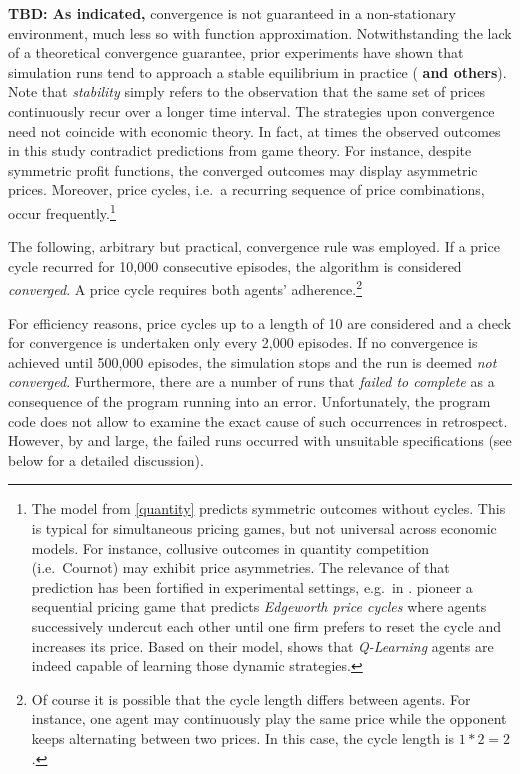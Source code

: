 \textbf{TBD: As indicated,} convergence is not guaranteed in a non-stationary environment, much less so with function approximation. Notwithstanding the lack of a theoretical convergence guarantee, prior experiments have shown that simulation runs tend to approach a stable equilibrium in practice (\cite{calvano_artificial_2019} \textbf{and others}). Note that \emph{stability} simply refers to the observation that the same set of prices continuously recur over a longer time interval. The strategies upon convergence need not coincide with economic theory. In fact, at times the observed outcomes in this study contradict predictions from game theory. For instance, despite symmetric profit functions, the converged outcomes may display asymmetric prices. Moreover, price cycles, i.e.\ a recurring sequence of price combinations, occur frequently.\footnote{The model from \autoref{quantity} predicts symmetric outcomes without cycles. This is typical for simultaneous pricing games, but not universal across economic models. For instance, collusive outcomes in quantity competition (i.e.\ Cournot) may exhibit price asymmetries. The relevance of that prediction has been fortified in experimental settings, e.g.\ in \textcite{fischer_collusion_2019}. \textcite{maskine-tirole} pioneer a sequential pricing game that predicts \emph{Edgeworth price cycles} where agents successively undercut each other until one firm prefers to reset the cycle and increases its price. Based on their model, \textcite{klein_autonomous_2019} shows that \emph{Q-Learning} agents are indeed capable of learning those dynamic strategies.}


The following, arbitrary but practical, convergence rule was employed. If a price cycle recurred for 10,000 consecutive episodes, the algorithm is considered \emph{converged}. A price cycle requires both agents' adherence.\footnote{Of course it is possible that the cycle length differs between agents. For instance, one agent may continuously play the same price while the opponent keeps alternating between two prices. In this case, the cycle length is $1*2=2$.}

For efficiency reasons, price cycles up to a length of 10 are considered and a check for convergence is undertaken only every 2,000 episodes. If no convergence is achieved until 500,000 episodes, the simulation stops and the run is deemed \emph{not converged}. Furthermore, there are a number of runs that \emph{failed to complete} as a consequence of the program running into an error. Unfortunately, the program code does not allow to examine the exact cause of such occurrences in retrospect. However, by and large, the failed runs occurred with unsuitable specifications (see below for a detailed discussion).

